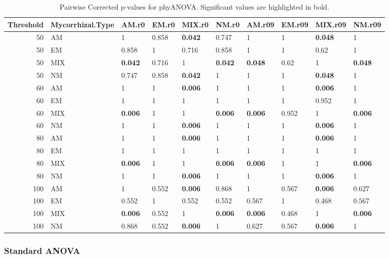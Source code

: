 \documentclass[]{article}
\begin{document}
\begin{table}[H]

\caption{\label{tab:unnamed-chunk-9}Pairwise Corrected p-values for phyANOVA. Significant values are highlighted in bold.}
\centering
\begin{tabular}{r|l|l|l|l|l|l|l|l|l}
\hline
Threshold & Mycorrhizal.Type & AM.r0 & EM.r0 & MIX.r0 & NM.r0 & AM.r09 & EM.r09 & MIX.r09 & NM.r09\\
\hline
50 & AM & 1 & 0.858 & \textbf{0.042} & 0.747 & 1 & 1 & \textbf{0.048} & 1\\
\hline
50 & EM & 0.858 & 1 & 0.716 & 0.858 & 1 & 1 & 0.62 & 1\\
\hline
50 & MIX & \textbf{0.042} & 0.716 & 1 & \textbf{0.042} & \textbf{0.048} & 0.62 & 1 & \textbf{0.048}\\
\hline
50 & NM & 0.747 & 0.858 & \textbf{0.042} & 1 & 1 & 1 & \textbf{0.048} & 1\\
\hline
60 & AM & 1 & 1 & \textbf{0.006} & 1 & 1 & 1 & \textbf{0.006} & 1\\
\hline
60 & EM & 1 & 1 & 1 & 1 & 1 & 1 & 0.952 & 1\\
\hline
60 & MIX & \textbf{0.006} & 1 & 1 & \textbf{0.006} & \textbf{0.006} & 0.952 & 1 & \textbf{0.006}\\
\hline
60 & NM & 1 & 1 & \textbf{0.006} & 1 & 1 & 1 & \textbf{0.006} & 1\\
\hline
80 & AM & 1 & 1 & \textbf{0.006} & 1 & 1 & 1 & \textbf{0.006} & 1\\
\hline
80 & EM & 1 & 1 & 1 & 1 & 1 & 1 & 1 & 1\\
\hline
80 & MIX & \textbf{0.006} & 1 & 1 & \textbf{0.006} & \textbf{0.006} & 1 & 1 & \textbf{0.006}\\
\hline
80 & NM & 1 & 1 & \textbf{0.006} & 1 & 1 & 1 & \textbf{0.006} & 1\\
\hline
100 & AM & 1 & 0.552 & \textbf{0.006} & 0.868 & 1 & 0.567 & \textbf{0.006} & 0.627\\
\hline
100 & EM & 0.552 & 1 & 0.552 & 0.552 & 0.567 & 1 & 0.468 & 0.567\\
\hline
100 & MIX & \textbf{0.006} & 0.552 & 1 & \textbf{0.006} & \textbf{0.006} & 0.468 & 1 & \textbf{0.006}\\
\hline
100 & NM & 0.868 & 0.552 & \textbf{0.006} & 1 & 0.627 & 0.567 & \textbf{0.006} & 1\\
\hline
\end{tabular}
\end{table}

\hypertarget{standard-anova-1}{%
\subsubsection{Standard ANOVA}\label{standard-anova-1}}
\end{document}
